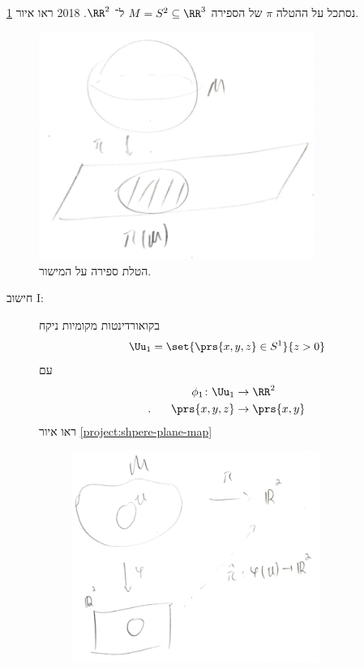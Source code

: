 \documentclass[a4paper,10pt,twoside,openany]{book}
\begin{document}
\begin{example}
נסתכל על ההטלה
$\pi$
של הספירה
$M = S^2 \subseteq \RR^3$
ל־%
$\RR^2$.%
%
{2018}
ראו איור
\ref{project:shpere-plane}.
\begin{figure}[ht]
\includegraphics[width=0.8\textwidth]{sources/sphere-on-plane}
\caption{הטלת ספירה על המישור.}
\label{project:shpere-plane}
\end{figure}
\begin{description}
\item[חישוב \textenglish{I}:]
בקואורדינטות מקומיות ניקח
\begin{align*}
\Uu_1 = \set{\prs{x,y,z} \in S^1}{z>0}
\end{align*}
עם
\begin{align*}
\phi_1 \colon \Uu_1 &\to \RR^2 \\
\text{.} \phantom{\phi_1 \colon} \prs{x,y,z} &\to \prs{x,y}
\end{align*}
ראו איור
\ref{project:shpere-plane-map}
\begin{figure}[ht]
\includegraphics[width=0.8\textwidth]{sources/sphere-on-plane-map}

\end{figure}
\end{description}
\end{example}
\end{document}
